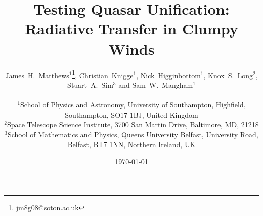 \documentclass[useAMS,usenatbib]{mn2e_x}
\begin{document}


\def\py{\textsc{Python}}
\def\tar{\textsc{Tardis}}
\def\cld{\textsc{Cloudy}}
\def\agn{\textsc{Agnspec}}


\def\civ{C~\textsc{iv}}
\def\nv{N~\textsc{v}}
\def\hei{He~\textsc{i}}
\def\heii{He~\textsc{ii}}
\def\heiiline{He~\textsc{ii}~$4686$\AA}
\def\mg{Mg~\textsc{ii}}
\def\al{Al~\textsc{iii}}
\def\heii{He~\textsc{ii}}
\def\ovi{O~\textsc{vi}}
\def\la{Ly~$\alpha$}
\def\ha{H~$\alpha$}
\def\hb{H~$\beta$}
\def\civline{C~\textsc{iv}~$1550$\AA}
\def\nvline{N~\textsc{v}~$1240$\AA}
\def\mgline{Mg~\textsc{ii}~$2800$\AA}


\def\araa{ARAA}
\def\nat{Nature}
\def\apjl{ApJ Letters}
\def\aapr{AAPR}
\def\ssr{SSR}
\def\apj{ApJ}
\def\apjs{ApJs}
\def\pasp{PASP}
\def\aap{A\&A}
\def\mnras{MNRAS}
\def\aj{AJ}
\def\rmxaa{RMXAA}
\def\aaps{A\&As}
\def\LA{Lyman\thinspace$\alpha$}

\newcommand{\EXPN}[2]{\mbox{$#1\times 10^{#2}$}}
\newcommand{\EXPU}[3]{\mbox{\rm $#1 \times 10^{#2} \rm\:#3$}}  %
\newcommand{\POW}[2]{\mbox{$\rm10^{#1}\rm\:#2$}}
\def\LUM{\:{\rm erg\:s^{-1}}}
\def\FLUX{\:{\rm erg\:cm^{-2}\:s^{-1}}}
\def\OIGS{\:{\rm erg\:cm^{-2}\:s^{-1}\:\AA^{-1}}}

%
%

\title
[Testing Quasar Unification: Radiative Transfer in Clumpy Winds]{
Testing Quasar Unification: Radiative Transfer in Clumpy Winds
}


\author[Matthews et al.]{
\parbox[t]{\textwidth}{
James~H.~Matthews$^1$\thanks{jm8g08@soton.ac.uk}, Christian~Knigge$^1$,
Nick~Higginbottom$^1$, Knox~S.~Long$^2$, Stuart~A.~Sim$^3$ and Sam~W.~Mangham$^1$
}
\medskip  
\\$^1$School of Physics and Astronomy, University of Southampton, Highfield, Southampton, SO17 1BJ, United Kingdom
\\$^2$Space Telescope Science Institute, 3700 San Martin Drive, Baltimore, MD, 21218
\\$^3$School of Mathematics and Physics, Queens University Belfast, University Road, Belfast, BT7 1NN, Northern Ireland, UK
}


\date{\today}
\end{document}
